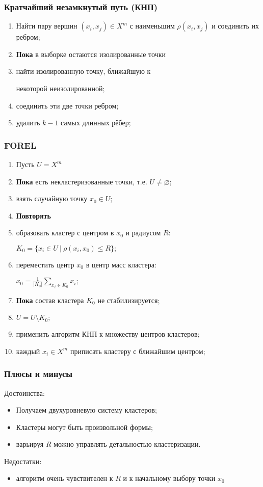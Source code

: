 \documentclass[12pt,pdf,notheorems]{beamer}
\renewcommand{\leq}{\leqslant}
\begin{document}
\begin{frame} \frametitle{Кратчайший незамкнутый путь (КНП)}
	\begin{enumerate}
	\item Найти пару вершин $(x_i, x_j) \in X^m$ с наименьшим $\rho(x_i, x_j)$ и соединить их ребром;
	\item \textbf{Пока} в выборке остаются изолированные точки
	\item \quad найти изолированную точку, ближайшую к 

		\quad некоторой неизолированной;
	\item \quad соединить эти две точки ребром;
	\item удалить $k-1$ самых длинных рёбер;
	\end{enumerate}
\end{frame}

\begin{frame}[shrink=20] \frametitle{FOREL}
	\begin{enumerate}
	\item Пусть $U=X^m$
	\item \textbf{Пока} есть некластеризованные точки, т.е. $U \neq \varnothing$;
	\item \quad взять случайную точку $x_0 \in U$;
	\item \quad \textbf{Повторять}
	\item \qquad образовать кластер с центром в $x_0$ и радиусом $R$:

		\qquad $K_0 = \{ x_i \in U ~|~ \rho(x_i, x_0) \leq R \};$
	\item \qquad переместить центр $x_0$ в центр масс кластера:

		\qquad $x_0 = \frac{1}{|K_0|} \sum_{x_i \in K_0} x_i;$
	\item \quad \textbf{Пока} состав кластера $K_0$ не стабилизируется;
	\item \quad $U= U \setminus K_0;$
	\item применить алгоритм КНП к множеству центров кластеров;
	\item каждый $x_i \in X^m$ приписать кластеру с ближайшим центром;
	\end{enumerate}
\end{frame}

\begin{frame}\frametitle{Плюсы и минусы}
	Достоинства:
	\begin{itemize}
		\item Получаем двухуровневую систему кластеров;
		\item Кластеры могут быть произвольной формы;
		\item варьируя $R$ можно управлять детальностью кластеризации.
	\end{itemize}
	Недостатки:
	\begin{itemize}
		\item алгоритм очень чувствителен к $R$ и к начальному выбору точки $x_0$
	\end{itemize}
\end{frame}
\end{document}

